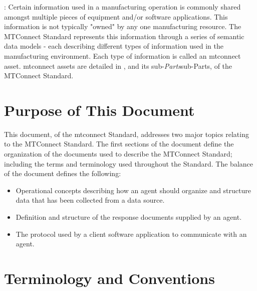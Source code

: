 \documentclass{mtconnect}	%
\providecommand{\DIFadd}[1]{{\hspace{0pt}\protect\color{blue}#1}} %
\providecommand{\DIFdel}[1]{{\hspace{0pt}\protect\color{red}#1}}                      %
\providecommand{\DIFaddbegin}{} %
\providecommand{\DIFaddend}{} %
\providecommand{\DIFdelbegin}{} %
\providecommand{\DIFdelend}{} %
\begin{document}
:  Certain information used in a manufacturing operation is commonly shared amongst multiple pieces of equipment and/or software applications.  This information is not typically "owned" by any one manufacturing resource.  The MTConnect Standard represents this information through a series of \glspl{semantic data model} - each describing different types of information used in the manufacturing environment.  Each type of information is called an \gls{mtconnect asset}. \glspl{mtconnect asset} are detailed in , and its \DIFdelbegin \DIFdel{sub-\textit{Parts}}\DIFdelend \DIFaddbegin \DIFadd{sub-Parts}\DIFaddend , of the MTConnect Standard.

\section{Purpose of This Document}

This document,  of the \gls{mtconnect}  Standard, addresses two major topics relating to the MTConnect Standard.  The first sections of the document define the organization of the documents used to describe the MTConnect Standard; including the terms and terminology used throughout the Standard.  The balance of the document defines the following:

\begin{itemize}
\item Operational concepts describing how an \gls{agent} should organize and structure data that has been collected from a data source.

\item Definition and structure of the \glspl{response document} supplied by an \gls{agent}.

\item The protocol used by a client software application to communicate with an \gls{agent}.
\end{itemize}

\section{Terminology and Conventions} \label{sec:Terminology and Conventions} 

\printglossary


\printbibliography[title=MTConnect References,keyword=MTC]

\end{document}
